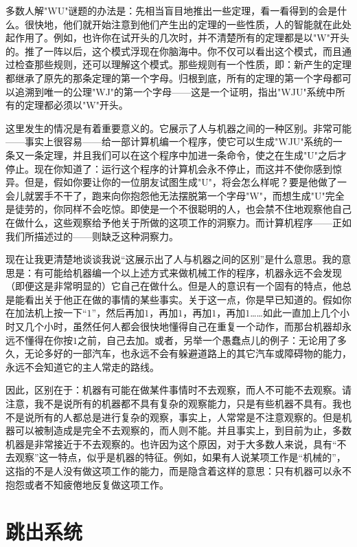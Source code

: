 多数人解"WU"谜题的办法是：先相当盲目地推出一些定理，看一看得到的会是什么。很快地，他们就开始注意到他们产生出的定理的一些性质，人的智能就在此处起作用了。例如，也许你在试开头的几次时，并不清楚所有的定理都是以"W"开头的。推了一阵以后，这个模式浮现在你脑海中。你不仅可以看出这个模式，而且通过检查那些规则，还可以理解这个模式。那些规则有一个性质，即：新产生的定理都继承了原先的那条定理的第一个字母。归根到底，所有的定理的第一个字母都可以追溯到唯一的公理"WJ"的第一个字母——这是一个证明，指出"WJU"系统中所有的定理都必须以"W"开头。

这里发生的情况是有着重要意义的。它展示了人与机器之间的一种区别。非常可能——事实上很容易——给一部计算机编一个程序，使它可以生成"WJU"系统的一条又一条定理，并且我们可以在这个程序中加进一条命令，使之在生成"U"之后才停止。现在你知道了：运行这个程序的计算机会永不停止，而这并不使你感到惊异。但是，假如你要让你的一位朋友试图生成"U"，将会怎么样呢？要是他做了一会儿就罢手不干了，跑来向你抱怨他无法摆脱第一个字母"W"，而想生成"U"完全是徒劳的，你同样不会吃惊。即使是一个不很聪明的人，也会禁不住地观察他自己在做什么，这些观察给予他关于所做的这项工作的洞察力。而计算机程序——正如我们所描述过的——则缺乏这种洞察力。

现在让我更清楚地谈谈我说“这展示出了人与机器之间的区别”是什么意思。我的意思是：有可能给机器编一个以上述方式来做机械工作的程序，机器永远不会发现（即便这是非常明显的）它自己在做什么。但是人的意识有一个固有的特点，他总是能看出关于他正在做的事情的某些事实。关于这一点，你是早已知道的。假如你在加法机上按一下“$1$”，然后再加$1$，再加$1$，再加$1$，再加$1$……如此一直加上几个小时又几个小时，虽然任何人都会很快地懂得自己在重复一个动作，而那台机器却永远不懂得在你按$1$之前，自己去加。或者，另举一个愚蠢点儿的例子：无论用了多久，无论多好的一部汽车，也永远不会有躲避道路上的其它汽车或障碍物的能力，永远不会知道它的主人常走的路线。

因此，区别在于：机器有可能在做某件事情时不去观察，而人不可能不去观察。请注意，我不是说所有的机器都不具有复杂的观察能力，只是有些机器不具有。我也不是说所有的人都总是进行复杂的观察，事实上，人常常是不注意观察的。但是机器可以被制造成是完全不去观察的，而人则不能。并且事实上，到目前为止，多数机器是非常接近于不去观察的。也许因为这个原因，对于大多数人来说，具有“不去观察”这一特点，似乎是机器的特征。例如，如果有人说某项工作是“机械的”，这指的不是人没有做这项工作的能力，而是隐含着这样的意思：只有机器可以永不抱怨或者不知疲倦地反复做这项工作。

\section{跳出系统}

